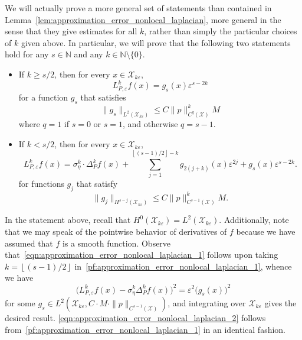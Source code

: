 \documentclass[aos]{imsart}
\theoremstyle{plain}
\theoremstyle{definition}
\theoremstyle{remark}
\newcommand{\mc}[1]{\mathcal{#1}}
\newcommand{\floor}[1]{\left\lfloor #1 \right\rfloor}
\newcommand{\1}{\mathbf{1}}
\begin{document}
We will actually prove a more general set of statements than contained in Lemma~\ref{lem:approximation_error_nonlocal_laplacian}, more general in the sense that they give estimates for all $k$, rather than simply the particular choices of $k$ given above. In particular, we will prove that the following two statements hold for any $s \in \mathbb{N}$ and any $k \in \mathbb{N} \setminus \{0\}$. 
\begin{itemize}
	\item If $k \geq s/2$, then for every $x \in \mc{X}_{k\varepsilon}$, 
	\begin{equation}
	\label{pf:approximation_error_nonlocal_laplacian_0}
	L_{P,\varepsilon}^kf(x) = g_s(x) \varepsilon^{s - 2k}
	\end{equation}
	for a function $g_s$ that satisfies
	\begin{equation}
	\label{pf:approximation_error_nonlocal_laplacian_0.5}
	\|g_s\|_{L^2(\mc{X}_{k\varepsilon})} \leq C \|p\|_{C^{q}(\mc{X})}^k M 
	\end{equation}
	where $q = 1$ if $s =0$ or $s = 1$, and otherwise $q = s - 1$. 
	\item If $k < s/2$, then for every $x \in \mc{X}_{k\varepsilon}$,
	\begin{equation}
	\label{pf:approximation_error_nonlocal_laplacian_1}
	L_{P,\varepsilon}^kf(x) = \sigma_{\eta}^k \cdot \Delta_{P}^kf(x) + \sum_{j = 1}^{\floor{(s - 1)/2} - k} g_{2(j + k)}(x)\varepsilon^{2j} + g_{s}(x) \varepsilon^{s - 2k}.
	\end{equation}
	for functions $g_j$ that satisfy
	\begin{equation}
	\label{pf:approximation_error_nonlocal_laplacian_1.5}
	\|g_j\|_{H^{s - j}(\mc{X}_{k\varepsilon})} \leq C \|p\|_{C^{s - 1}(\mc{X})}^k M.
	\end{equation}
\end{itemize}
In the statement above, recall that $H^0(\mc{X}_{k\varepsilon}) = L^2(\mc{X}_{k\varepsilon})$. Additionally, note that we may speak of the pointwise behavior of derivatives of $f$ because we have assumed that $f$ is a smooth function. Observe that~\eqref{eqn:approximation_error_nonlocal_laplacian_1} follows upon taking $k = \floor{(s - 1)/2}$ in~\eqref{pf:approximation_error_nonlocal_laplacian_1}, whence we have
\begin{equation*}
\bigl(L_{P,\varepsilon}^kf(x) - \sigma_{\eta}^k \Delta_{P}^kf(x)\bigr)^2 = \varepsilon^2 \bigl(g_s(x)\bigr)^2
\end{equation*}
for some $g_s \in L^2(\mc{X}_{k\varepsilon},C \cdot M \cdot \|p\|_{C^{s - 1}(\mc{X})})$, and integrating over $\mc{X}_{k\varepsilon}$ gives the desired result. \eqref{eqn:approximation_error_nonlocal_laplacian_2} follows from~\eqref{pf:approximation_error_nonlocal_laplacian_1} in an identical fashion. 
\end{document}
